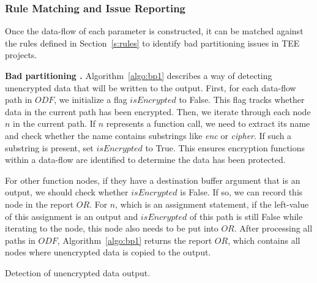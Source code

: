 \subsubsection{Rule Matching and Issue Reporting} Once the data-flow of each parameter is constructed, it can be matched against the rules defined in Section~\ref{s:rules} to identify bad partitioning issues in TEE projects.

\textbf{Bad partitioning .} 
Algorithm~\ref{algo:bp1} describes a way of detecting unencrypted data that will be written to the output.
First, for each data-flow path in $ODF$, we initialize a flag $isEncrypted$ to False. This flag tracks whether data in the current path has been encrypted.
Then, we iterate through each node $n$ in the current path.
If $n$ represents a function call, we need to extract its name and check whether the name contains substrings like \textit{enc} or \textit{cipher}. If such a substring is present, set $isEncrypted$ to True. This ensures encryption functions within a data-flow are identified to determine the data has been protected.

For other function nodes, if they have a destination buffer argument that is an output, we should check whether $isEncrypted$ is False.
If so, we can record this node in the report $OR$.
For $n$, which is an assignment statement, if the left-value of this assignment is an output and $isEncrypted$ of this path is still False while iterating to the node, this node also needs to be put into $OR$.
After processing all paths in $ODF$, Algorithm~\ref{algo:bp1} returns the report $OR$, which contains all nodes where unencrypted data is copied to the output.

\begin{algorithm}[t]
\caption{Detection of unencrypted data output.}
\label{algo:bp1}
\end{algorithm}

